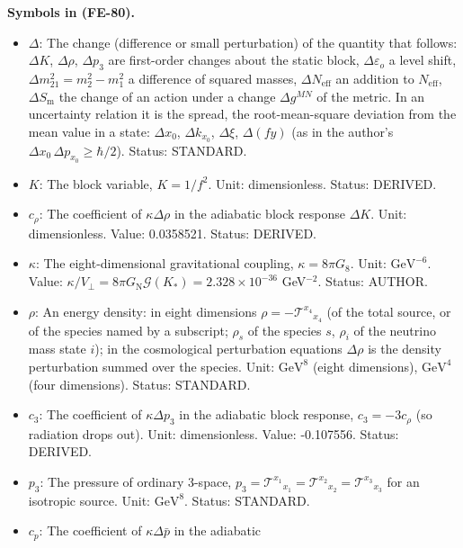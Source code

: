 \documentclass[
  10pt,
]{article}
\providecommand{\tightlist}{%
  \setlength{\itemsep}{0pt}\setlength{\parskip}{0pt}}
\begin{document}
\textbf{Symbols in (FE-80).}

\begin{itemize}
\tightlist
\item
  \(\Delta\): The change (difference or small perturbation) of the
  quantity that follows: \(\Delta K\), \(\Delta\rho\), \(\Delta p_3\)
  are first-order changes about the static block,
  \(\Delta\varepsilon_o\) a level shift,
  \(\Delta m^2_{21} = m_2^2 - m_1^2\) a difference of squared masses,
  \(\Delta N_{\mathrm{eff}}\) an addition to \(N_{\mathrm{eff}}\),
  \(\Delta S_{\mathrm{m}}\) the change of an action under a change
  \(\Delta g^{MN}\) of the metric. In an uncertainty relation it is the
  spread, the root-mean-square deviation from the mean value in a state:
  \(\Delta x_0\), \(\Delta k_{x_0}\), \(\Delta\xi\), \(\Delta(fy)\) (as
  in the author's \(\Delta x_0\,\Delta p_{x_0} \ge \hbar/2\)). Status:
  STANDARD.
\item
  \(K\): The block variable, \(K = 1/f^2\). Unit: dimensionless. Status:
  DERIVED.
\item
  \(c_\rho\): The coefficient of \(\kappa\Delta\rho\) in the adiabatic
  block response \(\Delta K\). Unit: dimensionless. Value: 0.0358521.
  Status: DERIVED.
\item
  \(\kappa\): The eight-dimensional gravitational coupling,
  \(\kappa = 8\pi G_8\). Unit: \(\mathrm{GeV}^{-6}\). Value:
  \(\kappa/V_\perp = 8\pi G_{\mathrm{N}}\mathcal{G}(K_*) = 2.328\times10^{-36}\)
  GeV\(^{-2}\). Status: AUTHOR.
\item
  \(\rho\): An energy density: in eight dimensions
  \(\rho = -\mathcal{T}^{x_4}{}_{x_4}\) (of the total source, or of the
  species named by a subscript; \(\rho_s\) of the species \(s\),
  \(\rho_i\) of the neutrino mass state \(i\)); in the cosmological
  perturbation equations \(\Delta\rho\) is the density perturbation
  summed over the species. Unit: \(\mathrm{GeV}^{8}\) (eight
  dimensions), \(\mathrm{GeV}^{4}\) (four dimensions). Status: STANDARD.
\item
  \(c_3\): The coefficient of \(\kappa\Delta p_3\) in the adiabatic
  block response, \(c_3 = -3c_\rho\) (so radiation drops out). Unit:
  dimensionless. Value: -0.107556. Status: DERIVED.
\item
  \(p_3\): The pressure of ordinary 3-space,
  \(p_3 = \mathcal{T}^{x_1}{}_{x_1} = \mathcal{T}^{x_2}{}_{x_2} = \mathcal{T}^{x_3}{}_{x_3}\)
  for an isotropic source. Unit: \(\mathrm{GeV}^{8}\). Status: STANDARD.
\item
  \(c_p\): The coefficient of \(\kappa\Delta\bar p\) in the adiabatic

\end{itemize}
\end{document}
